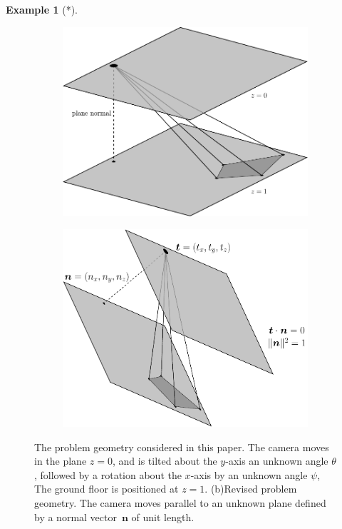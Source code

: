 \documentclass[11pt,a4paper]{article}
\theoremstyle{definition}
\newtheorem{example}{Example}
\newcommand{\mat}[1]{\bm{#1}}
\begin{document}
\begin{example}[*]
\begin{figure}[t!]
\centering
\begin{subfigure}[b]{0.475\textwidth}
    \centering
    \includegraphics[width=\textwidth]{prob_geom1}
    \caption{}
    \label{fig:prob_geom:a}
\end{subfigure}
\hfill
\begin{subfigure}[b]{0.475\textwidth}
    \centering
    \includegraphics[width=\textwidth]{prob_geom1b}
    \caption{}
    \label{fig:prob_geom:b}
\end{subfigure}
\caption{The problem geometry considered in this paper. The camera moves in the plane $z=0$,
and is tilted about the $y$-axis an unknown angle $\theta$, followed by a rotation about
the $x$-axis by an unknown angle $\psi$, The ground floor is positioned at $z=1$.
(b)Revised problem geometry. The camera moves parallel to an unknown plane
defined by a normal vector~$\mat{n}$ of unit length.}
\label{fig:prob_geom}
\end{figure}


\end{example}
\end{document}
